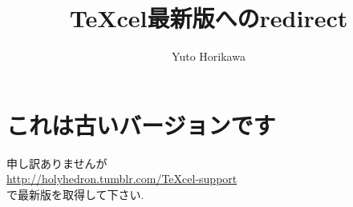 \documentclass[12pt]{jsarticle}
\title{TeXcel最新版へのredirect}
\author{Yuto Horikawa}
\begin{document}
\pagestyle{empty}
\maketitle
\section{これは古いバージョンです}
申し訳ありませんが \\
\url{http://holyhedron.tumblr.com/TeXcel-support} \\
で最新版を取得して下さい.
\end{document}
